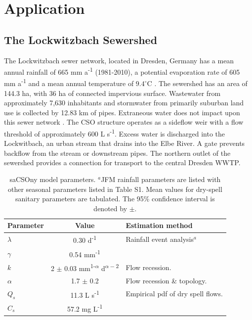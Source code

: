 \documentclass[draft,linenumbers]{agujournal2018}
\begin{document}
\section{Application}
\subsection{The Lockwitzbach Sewershed}
The Lockwitzbach sewer network, located in Dresden, Germany has a mean annual rainfall of 665 mm a\textsuperscript{-1} (1981-2010), a potential evaporation rate of 605 mm a\textsuperscript{-1} and a mean annual temperature of $9.4^\circ$C \citep{DWetter}. The sewershed has an area of 144.3 ha, with 36 ha of connected impervious surface. Wastewater from approximately 7,630 inhabitants and stormwater from primarily suburban land use is collected by 12.83 km of pipes. Extraneous water does not impact upon this sewer network \cite{Karpf_2011}. The CSO structure operates as a sidef\/low weir with a f\/low threshold of approximately 600 L s\textsuperscript{-1}. Excess water is discharged into the Lockwitbach, an urban stream that drains into the Elbe River. A gate prevents backf\/low from the stream or downstream pipes. The northern outlet of the sewershed provides a connection for transport to the central Dresden WWTP. 

\begin{table}[htb]
 \caption{saCSOny model parameters. $^{a}$JFM rainfall parameters are listed with other seasonal parameters listed in Table S1. Mean values for dry-spell sanitary parameters are tabulated. The 95\% conf\/idence interval is denoted by $\pm$.}
  \label{tab:one}
 \centering
 \begin{tabular}{l c l}
 \hline
  Parameter  & Value & Estimation method  \\
 \hline
   $\lambda$  & 0.30 d\textsuperscript{-1} & Rainfall event analysis$^{a}$\\
   $\gamma$  & 0.54 mm\textsuperscript{-1}  &\\
   $k$  & 2 $\pm$ 0.03 mm\textsuperscript{1-$\alpha$} d\textsuperscript{$\alpha-2$}  &  Flow recession.\\
   $\alpha$  & 1.7 $\pm$ 0.2 & Flow recession \& topology.  \\
  $Q_s$  & 11.3 L s\textsuperscript{-1}  & Empirical pdf of dry spell f\/lows.\\
   $C_s$  & 57.2 mg L\textsuperscript{-1} &   \\
 \hline
 \end{tabular}
 \end{table}
\end{document}
